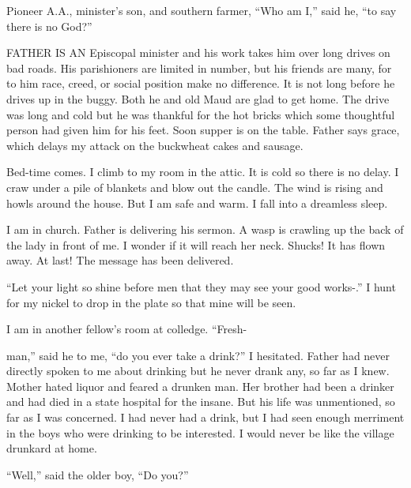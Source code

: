 
\bbChapterPreamble


\begin{biblechapter}
    Pioneer A.A., minister’s son, 
    and southern farmer,
    “Who am I,” said he, 
    “to say there is no God?”
\end{biblechapter}


\begin{biblechapter}
    FATHER IS AN Episcopal minister and his work takes him over long drives on bad roads.
\verse His parishioners are limited in number, 
    but his friends are many, 
    for to him race, creed, or social position make no difference.
\verse It is not long before he drives up in the buggy.
\verse Both he and old Maud are glad to get home.
\verse The drive was long and cold but he was thankful for the hot bricks 
    which some thoughtful person had given him for his feet.
\verse Soon supper is on the table.
\verse Father says grace, 
    which delays my attack on the buckwheat cakes and sausage.

\verse Bed-time comes. I climb to my room in the attic. It is cold so there is no delay. I craw under a pile of blankets and blow out the candle. The wind is rising and howls around the house. But I am safe and warm. I fall into a dreamless sleep.

I am in church. Father is delivering his sermon. A wasp is crawling up the back of the lady in front of me. I wonder if it will reach her neck. Shucks! It has flown away. At last! The message has been delivered.

“Let your light so shine before men that they may see your good works-.” I hunt for my nickel to drop in the plate so that mine will be seen.

I am in another fellow’s room at colledge. “Fresh-

man,” said he to me, “do you ever take a drink?” I hesitated. Father had never directly spoken to me about drinking but he never drank any, so far as I knew. Mother hated liquor and feared a drunken man. Her brother had been a drinker and had died in a state hospital for the insane. But his life was unmentioned, so far as I was concerned. I had never had a drink, but I had seen enough merriment in the boys who were drinking to be interested. I would never be like the village drunkard at home.

“Well,” said the older boy, “Do you?”


\end{biblechapter}
